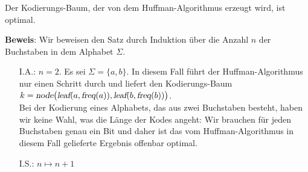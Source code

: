 \begin{Satz}
  Der Kodierungs-Baum, der von dem Huffman-Algorithmus erzeugt wird, ist optimal.
\end{Satz}

\noindent
\textbf{Beweis}:  Wir beweisen den Satz durch Induktion \"uber die Anzahl $n$ der Buchstaben in dem
Alphabet $\Sigma$.
\begin{enumerate}
\item[I.A.:] $n = 2$.  Es sei $\Sigma= \{a,b\}$.
  In diesem Fall f\"uhrt der Huffman-Algorithmus nur einen Schritt durch und liefert den Kodierungs-Baum 
  \\[0.2cm]
  \hspace*{1.3cm}
  $k=\textsl{node}\bigl(\textsl{leaf}(a, \textsl{freq}(a)), \textsl{leaf}(b,\textsl{freq}(b))\bigr)$.
  \\[0.2cm]
  Bei der Kodierung eines Alphabets, das aus zwei Buchstaben besteht, haben wir keine Wahl, 
  was die L\"ange der Kodes angeht: Wir brauchen f\"ur jeden Buchstaben genau ein Bit und daher ist das vom
  Huffman-Algorithmus in diesem Fall gelieferte Ergebnis offenbar optimal.
\item[I.S.:] $n \mapsto n+1$


\end{enumerate}
